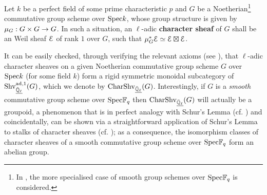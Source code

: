             \begin{definition} \label{def: character_sheaves}
                Let $k$ be a perfect field of some prime characteristic $p$ and $G$ be a Noetherian\footnote{In \cite{cunningham_roe_function_sheaf_dictionary_quasi_characters_p_adic_tori}, the more specialised case of smooth group schemes over $\mathrm{Spec} \mathbb{F}_q$ is considered.} commutative group scheme over $\mathrm{Spec} k$, whose group structure is given by $\mu_G: G \x G \to G$. In such a situation, an $\ell$-adic \textbf{character sheaf} of $G$ shall be an Weil sheaf $\mathcal{E}$ of rank $1$ over $G$, such that $\mu_G^*\mathcal{E} \simeq \mathcal{E} \boxtimes \mathcal{E}$.
            \end{definition}
            \begin{remark} \label{remark: rigid_monoidal_categories_of_character_sheaves}
                \cite[Subsection 1.2]{cunningham_roe_function_sheaf_dictionary_quasi_characters_p_adic_tori} It can be easily checked, through verifying the relevant axioms (see \cite[Definition 2.10.11]{EGNO}), that $\ell$-adic character sheaves on a given Noetherian commutative group scheme $G$ over $\mathrm{Spec} k$ (for some field $k$) form a rigid symmetric monoidal subcategory of $\mathrm{Shv}_{\underline{\bar{\mathbb{Q}}_{\ell}}}^{\mathrm{ad}, 1}(G)$, which we denote by $\mathrm{Char}\mathrm{Shv}_{\underline{\bar{\mathbb{Q}}_{\ell}}}(G)$. Interestingly, if $G$ is a \textit{smooth} commutative group scheme over $\mathrm{Spec} \mathbb{F}_q$ then $\mathrm{Char}\mathrm{Shv}_{\underline{\bar{\mathbb{Q}}_{\ell}}}(G)$ will actually be a groupoid, a phenomenon that is in perfect analogy with Schur's Lemma (cf. \cite[Lemma 3.6]{lam_first_course_in_noncommutative_rings}) and coincidentally, can be shown via a straightforward application of Schur's Lemma to stalks of character sheaves (cf. \cite[Lemma 1.3]{cunningham_roe_function_sheaf_dictionary_quasi_characters_p_adic_tori}); as a consequence, the isomorphism classes of character sheaves of a smooth commutative group scheme over $\mathrm{Spec} \mathbb{F}_q$ form an abelian group. 
            \end{remark}
            
